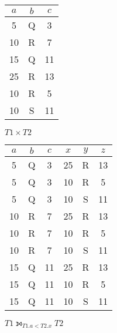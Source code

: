 \begin{problem}
\begin{enumalph}
    \begin{Answer}
      \centering
      \begin{tabular}{ c c c }
        \midrule
        $a$ & $b$ & $c$ \\
        \midrule
        5 & Q & 3 \\
        \midrule
        10 & R & 7 \\
        \midrule
        15 & Q & 11 \\
        \midrule
        25 & R & 13 \\
        \midrule
        10 & R & 5 \\
        \midrule
        10 & S & 11 \\
        \midrule
      \end{tabular}
    \end{Answer}

    \newpage
    \item $T1 \times T2$
    
    \begin{Answer}
      \centering
      \begin{tabular}{ c c c c c c }
        \midrule
        $a$ & $b$ & $c$ & $x$ & $y$ & $z$ \\
        \midrule
        5 & Q & 3 & 25 & R & 13 \\
        \midrule
        5 & Q & 3 & 10 & R & 5 \\
        \midrule
        5 & Q & 3 & 10 & S & 11 \\
        \midrule
        10 & R & 7 & 25 & R & 13 \\
        \midrule
        10 & R & 7 & 10 & R & 5 \\
        \midrule
        10 & R & 7 & 10 & S & 11 \\
        \midrule
        15 & Q & 11 & 25 & R & 13 \\
        \midrule
        15 & Q & 11 & 10 & R & 5 \\
        \midrule
        15 & Q & 11 & 10 & S & 11 \\
        \midrule
      \end{tabular}
    \end{Answer}

    \item $T1 \leftouterjoin_{T1.a < T2.x} T2$    
    \begin{Answer}
      

\end{Answer}
\end{enumalph}
\end{problem}

